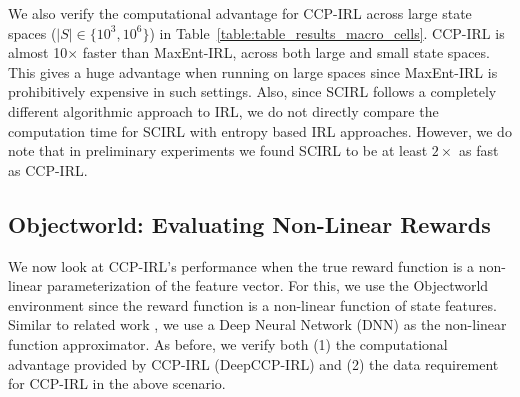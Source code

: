 \documentclass{article}
\begin{document}
We also verify the computational advantage for CCP-IRL across large state spaces ($|S| \in \{10^3, 10^6\}$) in Table~\ref{table:table_results_macro_cells}. CCP-IRL is almost 10$\times$ faster than MaxEnt-IRL, across both large and small state spaces. This gives a huge advantage when running on large spaces since MaxEnt-IRL is prohibitively expensive in such settings. Also, since SCIRL follows a completely different algorithmic approach to IRL, we do not directly compare the computation time for SCIRL with entropy based IRL approaches. However, we do note that in preliminary experiments we found SCIRL to be at least $2\times$ as fast as CCP-IRL.

\subsection{Objectworld: Evaluating Non-Linear Rewards}

We now look at CCP-IRL's performance when the true reward function is a non-linear parameterization of the feature vector.
For this, we use the Objectworld \cite{levine2011nonlinear} environment since the reward function is a non-linear function of state features.
Similar to related work \cite{wulfmeier2015maximum}, we use a Deep Neural Network (DNN) as the non-linear function approximator.
As before, we verify both (1) the computational advantage provided by CCP-IRL (DeepCCP-IRL) and (2) the data requirement for CCP-IRL in the above scenario.
\end{document}
